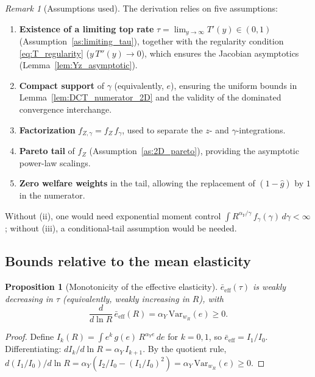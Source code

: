 \documentclass[12pt,a4paper]{article}
\theoremstyle{definition}
\theoremstyle{plain}
\newtheorem{proposition}{Proposition}[section]
\theoremstyle{remark}
\newtheorem{remark}{Remark}[section]
\begin{document}
\begin{remark}[Assumptions used]
\label{rem:assumptions_used_2D}
The derivation relies on five assumptions:
\begin{enumerate}[label=(\roman*)]
  \item \textbf{Existence of a limiting top rate} $\tau = \lim_{y \to \infty} T'(y) \in (0,1)$ (Assumption~\ref{as:limiting_tau}), together with the regularity condition \eqref{eq:T_regularity} ($y\,T''(y) \to 0$), which ensures the Jacobian asymptotics (Lemma~\ref{lem:Yz_asymptotic}).
  \item \textbf{Compact support} of $\gamma$ (equivalently, $e$), ensuring the uniform bounds in Lemma~\ref{lem:DCT_numerator_2D} and the validity of the dominated convergence interchange.
  \item \textbf{Factorization} $f_{Z,\gamma} = f_Z\,f_{\gamma}$, used to separate the $z$- and $\gamma$-integrations.
  \item \textbf{Pareto tail} of $f_Z$ (Assumption~\ref{as:2D_pareto}), providing the asymptotic power-law scalings.
  \item \textbf{Zero welfare weights} in the tail, allowing the replacement of $(1-\hat{g})$ by $1$ in the numerator.
\end{enumerate}
Without (ii), one would need exponential moment control $\int R^{\alpha_Y/\gamma}\,f_{\gamma}(\gamma)\,d\gamma < \infty$; without (iii), a conditional-tail assumption would be needed.
\end{remark}


\subsection{Bounds relative to the mean elasticity}

\begin{proposition}[Monotonicity of the effective elasticity]
\label{prop:e_eff_mono}
$\bar{e}_{\mathrm{eff}}(\tau)$ is weakly decreasing in $\tau$ (equivalently, weakly increasing in $R$), with
\begin{equation}
\label{eq:e_eff_deriv}
  \frac{d}{d\ln R}\,\bar{e}_{\mathrm{eff}}(R) = \alpha_Y\,\mathrm{Var}_{w_R}(e) \geq 0.
\end{equation}
\end{proposition}

\begin{proof}
Define $I_k(R) = \int e^k\,g(e)\,R^{\alpha_Y e}\,de$ for $k = 0,1$, so $\bar{e}_{\mathrm{eff}} = I_1/I_0$.  Differentiating: $dI_k/d\ln R = \alpha_Y\,I_{k+1}$.  By the quotient rule, $d(I_1/I_0)/d\ln R = \alpha_Y(I_2/I_0 - (I_1/I_0)^2) = \alpha_Y\,\mathrm{Var}_{w_R}(e) \geq 0$.
\end{proof}
\end{document}
